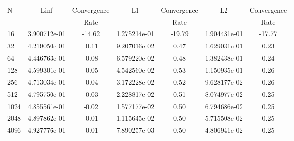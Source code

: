 \documentclass[12pt]{article}
\begin{document}
	\begin{tabular}{l|c|c|c|c|c|c}
		N&Linf&Convergence&L1&Convergence&L2&Convergence\\
		&&Rate&&Rate&&Rate\\
		\hline
		16&3.900712e-01&-14.62&1.275214e-01&-19.79&1.904431e-01&-17.77\\
		\hline
		32&4.219050e-01&-0.11&9.207016e-02&0.47&1.629031e-01&0.23\\
		\hline
		64&4.446763e-01&-0.08&6.579220e-02&0.48&1.382438e-01&0.24\\
		\hline
		128&4.599301e-01&-0.05&4.542560e-02&0.53&1.150935e-01&0.26\\
		\hline
		256&4.713034e-01&-0.04&3.172228e-02&0.52&9.628177e-02&0.26\\
		\hline
		512&4.795750e-01&-0.03&2.228817e-02&0.51&8.074977e-02&0.25\\
		\hline
		1024&4.855561e-01&-0.02&1.577177e-02&0.50&6.794686e-02&0.25\\
		\hline
		2048&4.897862e-01&-0.01&1.115645e-02&0.50&5.715508e-02&0.25\\
		\hline
		4096&4.927776e-01&-0.01&7.890257e-03&0.50&4.806941e-02&0.25\\
	\end{tabular}
\end{document}
